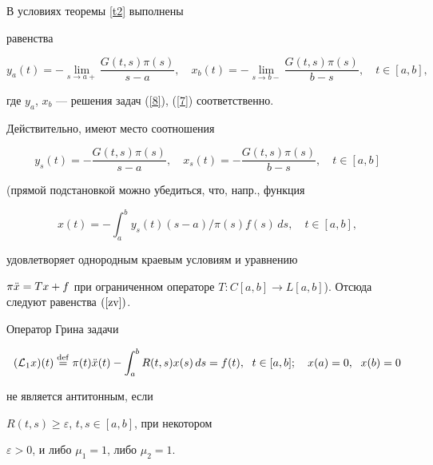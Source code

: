 \begin{notes}


В условиях теоремы \ref{t2} выполнены


равенства


\begin{equation}\label{zv}


y_a(t)=-\lim\limits_{s\to


a+}\dfrac{G(t,s)\pi(s)}{s-a},\quad x_b(t)=-\lim\limits_{s\to


b-}\dfrac{G(t,s)\pi(s)}{b-s},\quad t\in[a,b],


\end{equation}


где $y_a$, $x_b$ --- решения задач (\ref{8}), (\ref{7}) соответственно.





Действительно, имеют место соотношения


$$


y_s(t)=-\dfrac{G(t,s)\pi(s)}{s-a},\quad x_s(t)=-\dfrac{G(t,s)\pi(s)}{b-s},


\quad t\in[a,b]


$$


(прямой подстановкой можно убедиться, что, напр., функция


$$


x(t)=-\int_a^b y_s(t)(s-a)/\pi(s) f(s)\,ds,\quad t\in[a,b],


$$


удовлетворяет однородным краевым условиям и уравнению


$\pi\Ddot x=Tx+f$ при ограниченном операторе $T: C[a,b]\to


L[a,b]$). Отсюда следуют равенства $(\ref{zv})$.


\end{notes}





\begin{cors}\label{sl1}


Оператор Грина задачи


\begin{equation}\label{zsl1}


(\L_1x)(t)\df


\pi(t)\Ddot x(t)-\displaystyle\int_a^b R(t,s)x(s)\,ds=f(t),


\ \; t\in[a,b];\quad


x(a)=0,\ \; x(b)=0


\end{equation}


не является антитонным, если


$R(t,s)\ge\varepsilon$, $t,s\in[a,b]$, при некотором


$\varepsilon>0$, и либо $\mu_1=1$, либо $\mu_2=1$.


\end{cors}





